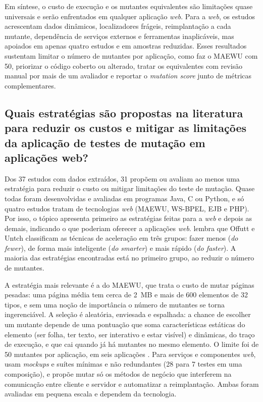 Em síntese, o custo de execução e os mutantes equivalentes são limitações quase universais e serão enfrentados em qualquer aplicação \textit{web}. Para a \textit{web}, os estudos acrescentam dados dinâmicos, localizadores frágeis, reimplantação a cada mutante, dependência de serviços externos e ferramentas inaplicáveis, mas apoiados em apenas quatro estudos e em amostras reduzidas. Esses resultados sustentam limitar o número de mutantes por aplicação, como faz o MAEWU com 50, priorizar o código coberto ou alterado, tratar os equivalentes com revisão manual por mais de um avaliador e reportar o \textit{mutation score} junto de métricas complementares.

\subsection[Estratégias para reduzir os custos]{Quais estratégias são propostas na literatura para reduzir os custos e mitigar as limitações da aplicação de testes de mutação em aplicações web?}
\label{subsec:estrategias-reducao}

Dos 37 estudos com dados extraídos, 31 propõem ou avaliam ao menos uma estratégia para reduzir o custo ou mitigar limitações do teste de mutação. Quase todas foram desenvolvidas e avaliadas em programas Java, C ou Python, e só quatro estudos tratam de tecnologias \textit{web} (MAEWU, WS-BPEL, EJB e PHP). Por isso, o tópico apresenta primeiro as estratégias feitas para a \textit{web} e depois as demais, indicando o que poderiam oferecer a aplicações \textit{web}.  lembra que Offutt e Untch classificam as técnicas de aceleração em três grupos: fazer menos (\textit{do fewer}), de forma mais inteligente (\textit{do smarter}) e mais rápido (\textit{do faster}). A maioria das estratégias encontradas está no primeiro grupo, ao reduzir o número de mutantes.

A estratégia mais relevante é a do MAEWU, que trata o custo de mutar páginas pesadas: uma página média tem cerca de 2~MB e mais de 600 elementos de 32 tipos, e sem uma noção de importância o número de mutantes se torna ingerenciável. A seleção é aleatória, enviesada e espalhada: a chance de escolher um mutante depende de uma pontuação que soma características estáticas do elemento (ser folha, ter texto, ser interativo e estar visível) e dinâmicas, do traço de execução, e que cai quando já há mutantes no mesmo elemento. O limite foi de 50 mutantes por aplicação, em seis aplicações \cite{yandrapally2021}. Para serviços e componentes \textit{web},  usam \textit{mockups} e suítes mínimas e não redundantes (28 para 7 testes em uma composição), e  propõe mutar só os métodos de negócio que interferem na comunicação entre cliente e servidor e automatizar a reimplantação. Ambas foram avaliadas em pequena escala e dependem da tecnologia.

